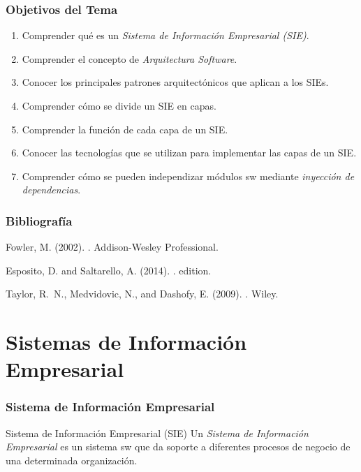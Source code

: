 \documentclass[a4paper,t,xcolor=pst,dvips,colortheme]{beamer}
\begin{document}
\begin{frame}[c]
    \frametitle{Objetivos del Tema}
    \begin{enumerate}[<+->]
         \item Comprender qué es un \emph{Sistema de Información Empresarial (SIE)}.
         \item Comprender el concepto de \emph{Arquitectura Software}.
         \item Conocer los principales patrones arquitectónicos que aplican a los SIEs.
         \item Comprender cómo se divide un SIE en capas.
         \item Comprender la función de cada capa de un SIE.
         \item Conocer las tecnologías que se utilizan para implementar las capas de un SIE.
         \item Comprender cómo se pueden independizar módulos sw mediante \emph{inyección de dependencias}.
    \end{enumerate}
\end{frame}

\begin{frame}[c]
    \frametitle{Bibliografía}
    \begin{thebibliography}{1}

        Fowler, M. (2002).
        .
        \newblock Addison-Wesley Professional.

        Esposito, D. and Saltarello, A. (2014).
        .
         edition.

        Taylor, R.~N., Medvidovic, N., and Dashofy, E. (2009).
        .
        \newblock Wiley.

    \end{thebibliography}
\end{frame}

\section{Sistemas de Información Empresarial}

\begin{frame}[c]
    \frametitle{Sistema de Información Empresarial}
    \begin{block}{Sistema de Información  Empresarial (SIE)}
        Un \emph{Sistema de Información Empresarial} es un sistema sw que da soporte a diferentes procesos de negocio de una determinada organización.
    \end{block}
\end{frame}
\end{document}
